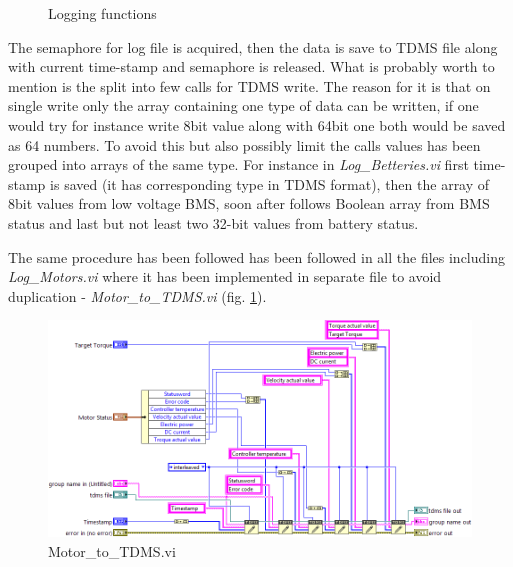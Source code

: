 \begin{figure}[h]\ContinuedFloat
    \centering
    \renewcommand{\thesubfigure}{}%
    \tightsubcaptions %
    \setlength{\subfloatlabelskip}{0pt}%
    \caption{Logging functions}
\end{figure}
The semaphore for log file is acquired, then the data is save to TDMS file along with current time-stamp and semaphore is released. What is probably worth to mention is the split into few calls for TDMS write. The reason for it is that on single write only the array containing one type of data can be written, if one would try for instance write 8bit value along with 64bit one both would be saved as 64 numbers. To avoid this but also possibly limit the calls values has been grouped into arrays of the same type. For instance in \textit{Log\_Betteries.vi} first time-stamp is saved (it has corresponding type in TDMS format), then the array of 8bit values from low voltage BMS, soon after follows Boolean array from BMS status and last but not least two 32-bit values from battery status.

The same procedure has been followed has been followed in all the files including \textit{Log\_Motors.vi} where it has been implemented in separate file to avoid duplication - \textit{Motor\_to\_TDMS.vi} (fig. \ref{vi:Motor_to_TDMS}).
\begin{figure}[H]
    \centering
    \includegraphics[width=\textwidth]{figures/Motor_to_TDMSd}
    \caption{Motor\_to\_TDMS.vi}
    \label{vi:Motor_to_TDMS}
\end{figure}